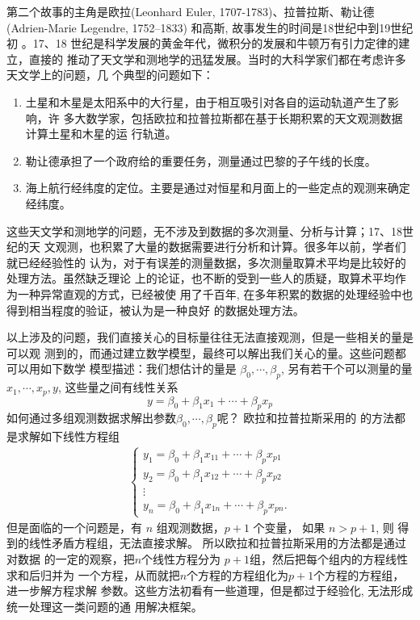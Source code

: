 第二个故事的主角是欧拉(Leonhard Euler, 1707-1783)、拉普拉斯、勒让德
(Adrien-Marie Legendre, 1752–1833) 和高斯, 故事发生的时间是18世纪中到19世纪初
。17、18 世纪是科学发展的黄金年代，微积分的发展和牛顿万有引力定律的建立，直接的
推动了天文学和测地学的迅猛发展。当时的大科学家们都在考虑许多天文学上的问题，几
个典型的问题如下：

\begin{enumerate}
\item 土星和木星是太阳系中的大行星，由于相互吸引对各自的运动轨道产生了影响，许
多大数学家，包括欧拉和拉普拉斯都在基于长期积累的天文观测数据计算土星和木星的运
行轨道。

\item 勒让德承担了一个政府给的重要任务，测量通过巴黎的子午线的长度。

\item 海上航行经纬度的定位。主要是通过对恒星和月面上的一些定点的观测来确定经纬度。

\end{enumerate}

这些天文学和测地学的问题，无不涉及到数据的多次测量、分析与计算；17、18世纪的天
文观测，也积累了大量的数据需要进行分析和计算。很多年以前，学者们就已经经验性的
认为，对于有误差的测量数据，多次测量取算术平均是比较好的处理方法。虽然缺乏理论
上的论证，也不断的受到一些人的质疑，取算术平均作为一种异常直观的方式，已经被使
用了千百年, 在多年积累的数据的处理经验中也得到相当程度的验证，被认为是一种良好
的数据处理方法。

以上涉及的问题，我们直接关心的目标量往往无法直接观测，但是一些相关的量是可以观
测到的，而通过建立数学模型，最终可以解出我们关心的量。这些问题都可以用如下数学
模型描述：我们想估计的量是 $\beta_0,\cdots,\beta_p$, 另有若干个可以测量的量
$x_1,\cdots,x_p, y$, 这些量之间有线性关系
$$ y = \beta_0 + \beta_1x_1 + \cdots + \beta_px_p $$
如何通过多组观测数据求解出参数$\beta_0,\cdots,\beta_p$呢？ 欧拉和拉普拉斯采用的
的方法都是求解如下线性方程组
\begin{eqnarray}
\left\{
\begin{array}{lll}
 y_1 = \beta_0 + \beta_1x_{11} + \cdots + \beta_px_{p1} \\
 y_2 = \beta_0 + \beta_1x_{12} + \cdots + \beta_px_{p2} \\
\vdots \\
 y_n = \beta_0 + \beta_1x_{1n} + \cdots + \beta_px_{pn} .
\end{array}
\right.
\end{eqnarray}
但是面临的一个问题是，有 $n$ 组观测数据，$p + 1$ 个变量， 如果 $n > p + 1$, 则
得到的线性矛盾方程组，无法直接求解。 所以欧拉和拉普拉斯采用的方法都是通过对数据
的一定的观察，把$n$个线性方程分为 $p+1$组，然后把每个组内的方程线性求和后归并为
一个方程，从而就把$n$个方程的方程组化为$p+1$个方程的方程组，进一步解方程求解
参数。这些方法初看有一些道理，但是都过于经验化, 无法形成统一处理这一类问题的通
用解决框架。

